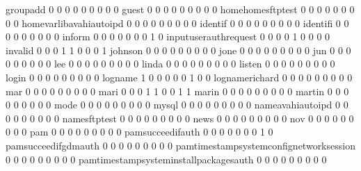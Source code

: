 \documentclass[compress,8pt]{beamer}
\begin{document}
\begin{frame}
\begin{Schunk}
  groupadd                                   0   0   0   0   0   0   0   0   0
  guest                                      0   0   0   0   0   0   0   0   0
  homehomesftptest                           0   0   0   0   0   0   0   0   0
  homevarlibavahiautoipd                     0   0   0   0   0   0   0   0   0
  identif                                    0   0   0   0   0   0   0   0   0
  identifi                                   0   0   0   0   0   0   0   0   0
  inform                                     0   0   0   0   0   0   0   1   0
  inputuserauthrequest                       0   0   0   0   1   0   0   0   0
  invalid                                    0   0   0   1   1   0   0   0   1
  johnson                                    0   0   0   0   0   0   0   0   0
  jone                                       0   0   0   0   0   0   0   0   0
  jun                                        0   0   0   0   0   0   0   0   0
  lee                                        0   0   0   0   0   0   0   0   0
  linda                                      0   0   0   0   0   0   0   0   0
  listen                                     0   0   0   0   0   0   0   0   0
  login                                      0   0   0   0   0   0   0   0   0
  logname                                    1   0   0   0   0   0   1   0   0
  lognamerichard                             0   0   0   0   0   0   0   0   0
  mar                                        0   0   0   0   0   0   0   0   0
  mari                                       0   0   0   1   1   0   0   1   1
  marin                                      0   0   0   0   0   0   0   0   0
  martin                                     0   0   0   0   0   0   0   0   0
  mode                                       0   0   0   0   0   0   0   0   0
  mysql                                      0   0   0   0   0   0   0   0   0
  nameavahiautoipd                           0   0   0   0   0   0   0   0   0
  namesftptest                               0   0   0   0   0   0   0   0   0
  news                                       0   0   0   0   0   0   0   0   0
  nov                                        0   0   0   0   0   0   0   0   0
  pam                                        0   0   0   0   0   0   0   0   0
  pamsucceedifauth                           0   0   0   0   0   0   0   1   0
  pamsucceedifgdmauth                        0   0   0   0   0   0   0   0   0
  pamtimestampsystemconfignetworksession     0   0   0   0   0   0   0   0   0
  pamtimestampsysteminstallpackagesauth      0   0   0   0   0   0   0   0   0

\end{Schunk}
\end{frame}
\end{document}
